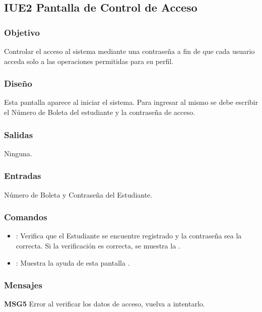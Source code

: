 \subsection{IUE2 Pantalla de Control de Acceso}

\subsubsection{Objetivo}
	Controlar el acceso al sistema mediante una contraseña a fin de que cada usuario acceda solo a las operaciones permitidas para su perfil.

\subsubsection{Diseño}
	Esta pantalla aparece al iniciar el sistema. Para ingresar al mismo se debe escribir el Número de Boleta del estudiante y la contraseña de acceso. 


\subsubsection{Salidas}

	Ninguna.

\subsubsection{Entradas}
Número de Boleta y Contraseña del Estudiante.

\subsubsection{Comandos}
\begin{itemize}
	\item {}: Verifica que el Estudiante se encuentre registrado y la contraseña sea la correcta. Si la verificación es correcta, se muestra la .
	\item {}: Muestra la ayuda de esta pantalla .
\end{itemize}

\subsubsection{Mensajes}
	\begin{Citemize}
		\item {\bf MSG5} Error al verificar los datos de acceso, vuelva a intentarlo.
	\end{Citemize}